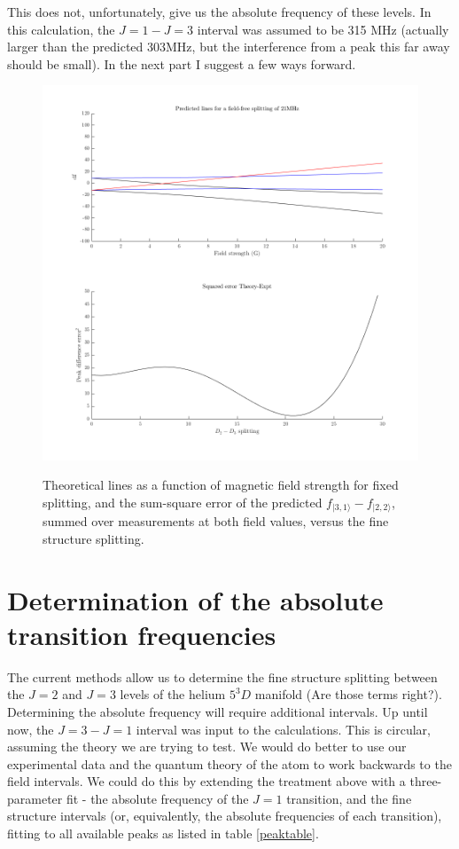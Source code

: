 \documentclass{article}
\begin{document}
This does not, unfortunately, give us the absolute frequency of these levels. In this calculation, the $J=1-J=3$ interval was assumed to be 315 MHz (actually larger than the predicted 303MHz, but the interference from a peak this far away should be small). In the next part I suggest a few ways forward.

\begin{figure}
\includegraphics[width=\textwidth]{figs/theory_splitting_work.png}
\label{theory_plots}
\caption{Theoretical lines as a function of magnetic field strength for fixed splitting, and the sum-square error of the predicted $f_{|3,1\rangle}-f_{|2,2\rangle}$, summed over measurements at both field values, versus the fine structure splitting.}
\end{figure}

\section{Determination of the absolute transition frequencies}

The current methods allow us to determine the fine structure splitting between the $J=2$ and $J=3$ levels of the helium $5^3D$ manifold (Are those terms right?). Determining the absolute frequency will require additional intervals. Up until now, the $J=3-J=1$ interval was input to the calculations. This is circular, assuming the theory we are trying to test. We would do better to use our experimental data and the quantum theory of the atom to work backwards to the field intervals. We could do this by extending the treatment above with a three-parameter fit - the absolute frequency of the $J=1$ transition, and the fine structure intervals (or, equivalently, the absolute frequencies of each transition), fitting to all available peaks as listed in table \ref{peaktable}. 
\end{document}
